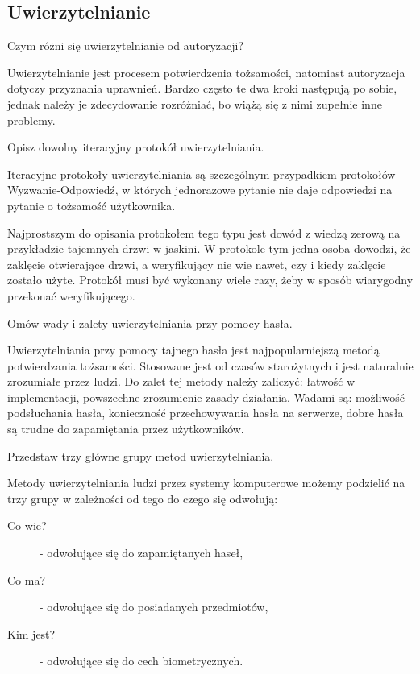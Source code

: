 \documentclass[answers,11pt]{exam}
\begin{document}
\subsection{Uwierzytelnianie}

\begin{questions}


\question Czym różni się uwierzytelnianie od autoryzacji?
\begin{solution}
Uwierzytelnianie jest procesem potwierdzenia tożsamości, natomiast autoryzacja dotyczy przyznania uprawnień. Bardzo często te dwa kroki następują po sobie, jednak należy je zdecydowanie rozróżniać, bo wiążą się z nimi zupełnie inne problemy.
\end{solution}

\question Opisz dowolny iteracyjny protokół uwierzytelniania.
\begin{solution}
Iteracyjne protokoły uwierzytelniania są szczególnym przypadkiem protokołów Wyzwanie-Odpowiedź, w których jednorazowe pytanie nie daje odpowiedzi na pytanie o tożsamość użytkownika. 

Najprostszym do opisania protokołem tego typu jest dowód z wiedzą zerową na przykładzie tajemnych drzwi w jaskini. W protokole tym jedna osoba dowodzi, że zaklęcie otwierające drzwi, a weryfikujący nie wie nawet, czy i kiedy zaklęcie zostało użyte. Protokół musi być wykonany wiele razy, żeby w sposób wiarygodny przekonać weryfikującego.
\end{solution}

\question Omów wady i zalety uwierzytelniania przy pomocy hasła.
\begin{solution}
Uwierzytelniania przy pomocy tajnego hasła jest najpopularniejszą metodą potwierdzania tożsamości. Stosowane jest od czasów starożytnych i jest naturalnie zrozumiałe przez ludzi. 
Do zalet tej metody należy zaliczyć: łatwość w implementacji, powszechne zrozumienie zasady działania.
Wadami są: możliwość podsłuchania hasła, konieczność przechowywania hasła na serwerze, dobre hasła są trudne do zapamiętania przez użytkowników.
\end{solution}

\question Przedstaw trzy główne grupy metod uwierzytelniania.
\begin{solution}
Metody uwierzytelniania ludzi przez systemy komputerowe możemy podzielić na trzy grupy w zależności od tego do czego się odwołują:
\begin{description}
\item[Co wie?] - odwołujące się do zapamiętanych haseł,
\item[Co ma?] - odwołujące się do posiadanych przedmiotów,
\item[Kim jest?] - odwołujące się do cech biometrycznych.
\end{description}
\end{solution}


\end{questions}
\end{document}

